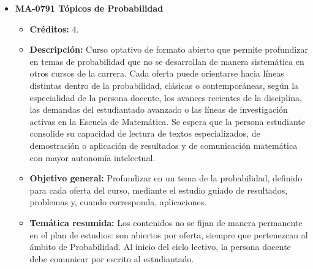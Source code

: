 \begin{itemize}[leftmargin=1.3em, itemsep=10pt, topsep=4pt, label={\color{Azul-UCR}$\blacksquare$}]
\item {\color{Azul-UCR}\textbf{MA-0791 Tópicos de Probabilidad}}\par\nopagebreak\smallskip
\begin{itemize}[leftmargin=1.1em, itemsep=3pt, topsep=2pt, parsep=2pt, label={\textendash}]
\item \textbf{Créditos:} 4.
\item \textbf{Descripción:} Curso optativo de formato abierto que permite profundizar en temas de probabilidad que no se desarrollan de manera sistemática en otros cursos de la carrera. Cada oferta puede orientarse hacia líneas distintas dentro de la probabilidad, clásicas o contemporáneas, según la especialidad de la persona docente, los avances recientes de la disciplina, las demandas del estudiantado avanzado o las líneas de investigación activas en la Escuela de Matemática. Se espera que la persona estudiante consolide su capacidad de lectura de textos especializados, de demostración o aplicación de resultados y de comunicación matemática con mayor autonomía intelectual.
\item \textbf{Objetivo general:} Profundizar en un tema de la probabilidad, definido para cada oferta del curso, mediante el estudio guiado de resultados, problemas y, cuando corresponda, aplicaciones.
\item \textbf{Temática resumida:} Los contenidos no se fijan de manera permanente en el plan de estudios: son abiertos por oferta, siempre que pertenezcan al ámbito de Probabilidad. Al inicio del ciclo lectivo, la persona docente debe comunicar por escrito al estudiantado.
\end{itemize}


\end{itemize}
